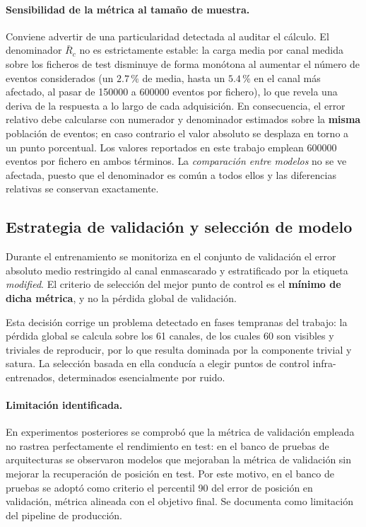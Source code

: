 \paragraph{Sensibilidad de la métrica al tamaño de muestra.} Conviene advertir de una particularidad
detectada al auditar el cálculo. El denominador $\bar{R}_c$ no es estrictamente estable: la carga
media por canal medida sobre los ficheros de test disminuye de forma monótona al aumentar el número
de eventos considerados (un $2.7\,\%$ de media, hasta un $5.4\,\%$ en el canal más afectado, al pasar
de \num{150000} a \num{600000} eventos por fichero), lo que revela una deriva de la respuesta a lo
largo de cada adquisición. En consecuencia, el error relativo debe calcularse con numerador y
denominador estimados sobre la \textbf{misma} población de eventos; en caso contrario el valor
absoluto se desplaza en torno a un punto porcentual. Los valores reportados en este trabajo emplean
\num{600000} eventos por fichero en ambos términos. La \emph{comparación entre modelos} no se ve
afectada, puesto que el denominador es común a todos ellos y las diferencias relativas se conservan
exactamente.

\subsection{Estrategia de validación y selección de modelo}
\label{subsec:validacion}

Durante el entrenamiento se monitoriza en el conjunto de validación el error absoluto medio
restringido al canal enmascarado y estratificado por la etiqueta \emph{modified}. El criterio de
selección del mejor punto de control es el \textbf{mínimo de dicha métrica}, y no la pérdida global
de validación.

Esta decisión corrige un problema detectado en fases tempranas del trabajo: la pérdida global se
calcula sobre los 61 canales, de los cuales 60 son visibles y triviales de reproducir, por lo que
resulta dominada por la componente trivial y satura. La selección basada en ella conducía a elegir
puntos de control infra-entrenados, determinados esencialmente por ruido.

\paragraph{Limitación identificada.} En experimentos posteriores se comprobó que la métrica de
validación empleada no rastrea perfectamente el rendimiento en test: en el banco de pruebas de
arquitecturas se observaron modelos que mejoraban la métrica de validación sin mejorar la
recuperación de posición en test. Por este motivo, en el banco de pruebas se adoptó como criterio el
percentil 90 del error de posición en validación, métrica alineada con el objetivo final. Se
documenta como limitación del pipeline de producción.

